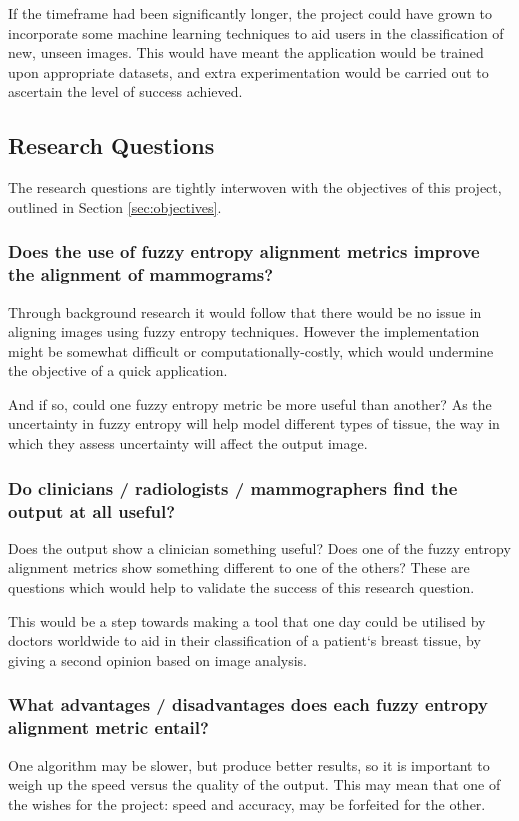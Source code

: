 If the timeframe had been significantly longer, the project could have grown to incorporate some machine learning techniques to aid users in the classification of new, unseen images. This would have meant the application would be trained upon appropriate datasets, and extra experimentation would be carried out to ascertain the level of success achieved.

\newpage
\subsection{Research Questions}
\label{ssec:research-qs}

The research questions are tightly interwoven with the objectives of this project, outlined in Section \ref{sec:objectives}.

\subsubsection{Does the use of fuzzy entropy alignment metrics improve the alignment of mammograms?}

Through background research it would follow that there would be no issue in aligning images using fuzzy entropy techniques. However the implementation might be somewhat difficult or computationally-costly, which would undermine the objective of a quick application.

And if so, could one fuzzy entropy metric be more useful than another? As the uncertainty in fuzzy entropy will help model different types of tissue, the way in which they assess uncertainty will affect the output image.

\subsubsection{Do clinicians / radiologists / mammographers find the output at all useful?}

Does the output show a clinician something useful? Does one of the fuzzy entropy alignment metrics show something different to one of the others? These are questions which would help to validate the success of this research question.

This would be a step towards making a tool that one day could be utilised by doctors worldwide to aid in their classification of a patient`s breast tissue, by giving a second opinion based on image analysis.

\subsubsection{What advantages / disadvantages does each fuzzy entropy alignment metric entail?}

One algorithm may be slower, but produce better results, so it is important to weigh up the speed versus the quality of the output. This may mean that one of the wishes for the project: speed and accuracy, may be forfeited for the other.
